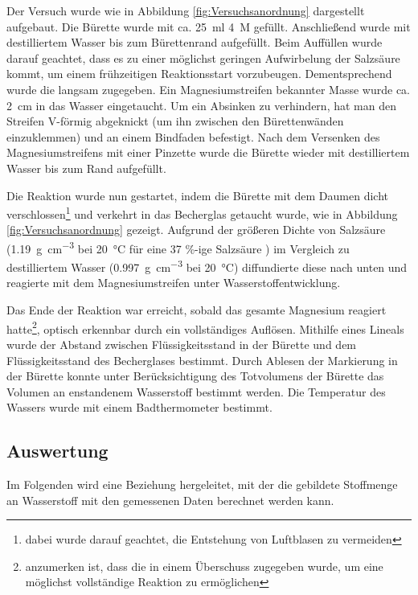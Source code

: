 \documentclass{article}
\begin{document}
    Der Versuch wurde wie in Abbildung \ref{fig:Versuchsanordnung} dargestellt aufgebaut. Die Bürette wurde mit ca. \SI[mode=text]{25}{\milli\litre} \SI[mode=text]{4}{M}  gefüllt. Anschließend wurde mit destilliertem Wasser bis zum Bürettenrand aufgefüllt. Beim Auffüllen wurde darauf geachtet, dass es zu einer möglichst geringen Aufwirbelung der Salzsäure kommt, um einem frühzeitigen Reaktionsstart vorzubeugen. Dementsprechend wurde die  langsam zugegeben. Ein  Magnesiumstreifen bekannter Masse wurde ca. \SI[mode=text]{2}{\centi\meter} in das Wasser eingetaucht. Um ein Absinken zu verhindern, hat man den Streifen V-förmig abgeknickt (um ihn zwischen den Bürettenwänden einzuklemmen) und an einem Bindfaden befestigt. Nach dem Versenken des Magnesiumstreifens mit einer Pinzette wurde die Bürette wieder mit destilliertem Wasser bis zum Rand aufgefüllt. 
    
    Die Reaktion wurde nun gestartet, indem die Bürette mit dem Daumen dicht verschlossen\footnote{dabei wurde darauf geachtet, die Entstehung von Luftblasen zu vermeiden} und verkehrt in das Becherglas getaucht wurde, wie in Abbildung \ref{fig:Versuchsanordnung} gezeigt. Aufgrund der größeren Dichte von Salzsäure (\SI[mode=text]{1.19}{\gram\per\cubic\centi\metre} bei \SI[mode=text]{20}{\degreeCelsius} für eine 37 \%-ige Salzsäure \cite{Salzs}) im Vergleich zu destilliertem Wasser (\SI[mode=text]{0.997}{\gram\per\cubic\centi\metre} bei \SI[mode=text]{20}{\degreeCelsius}) diffundierte diese nach unten und reagierte mit dem Magnesiumstreifen unter Wasserstoffentwicklung. 
    
    Das Ende der Reaktion war erreicht, sobald das gesamte Magnesium reagiert hatte\footnote{anzumerken ist, dass die  in einem Überschuss zugegeben wurde, um eine möglichst vollständige Reaktion zu ermöglichen}, optisch erkennbar durch ein vollständiges Auflösen. Mithilfe eines Lineals wurde der Abstand zwischen Flüssigkeitsstand in der Bürette und dem Flüssigkeitsstand des Becherglases bestimmt. Durch Ablesen der Markierung in der Bürette konnte unter Berücksichtigung des Totvolumens der Bürette das Volumen an enstandenem Wasserstoff bestimmt werden. Die Temperatur des Wassers wurde mit einem Badthermometer bestimmt.  
     
    \subsection{Auswertung}
    
      Im Folgenden wird eine Beziehung hergeleitet, mit der die gebildete Stoffmenge an Wasserstoff mit den gemessenen Daten berechnet werden kann. 
      
\end{document}
